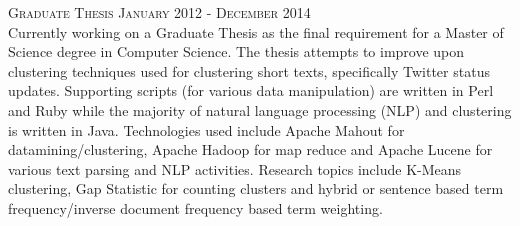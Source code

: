 
\textsc{Graduate Thesis} \hfill \textsc{January 2012} - \textsc{December 2014} \\
Currently working on a Graduate Thesis as the final requirement for a Master of
Science degree in Computer Science.  The thesis attempts to improve upon
clustering techniques used for clustering short texts, specifically Twitter
status updates.  Supporting scripts (for various data manipulation) are written
in Perl and Ruby while the majority of natural language processing (NLP) and
clustering is written in Java.  Technologies used include Apache Mahout for
datamining/clustering, Apache Hadoop for map reduce and Apache Lucene for
various text parsing and NLP activities.  Research topics include K-Means
clustering, Gap Statistic for counting clusters and hybrid or sentence based
term frequency/inverse document frequency based term weighting.
